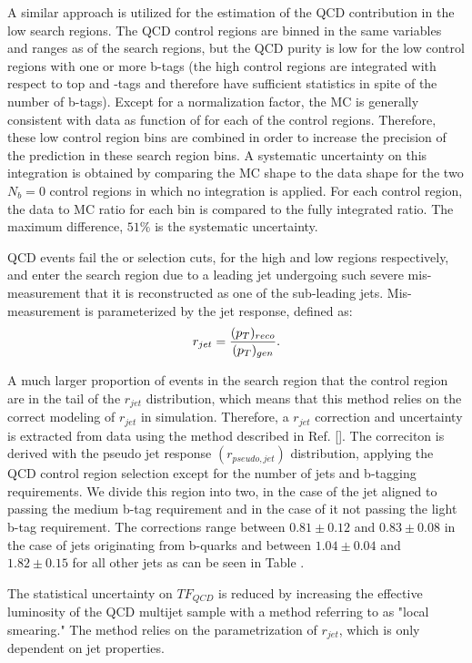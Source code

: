 A similar approach is utilized for the estimation of the QCD contribution in the low \dm{} search regions. The QCD control regions are binned in the same variables and ranges as of the search regions, but the QCD purity is low for the low \dm{} control regions with one or more b-tags (the high \dm{} control regions are integrated with respect to top and \W-tags and therefore have sufficient statistics in spite of the number of b-tags). Except for a normalization factor, the MC is generally consistent with data as function of \met{} for each of the control regions. Therefore, these low \dm{} control region \met{} bins are combined in order to increase the precision of the prediction in these search region bins. A systematic uncertainty on this integration is obtained by comparing the MC \met{} shape to the data shape for the two $N_b=0$ control regions in which no integration is applied. For each control region, the data to MC ratio for each \met{} bin is compared to the fully integrated ratio. The maximum difference, $51\%$ is the systematic uncertainty.

QCD events fail the \qcdhighdm{} or \qcdlowdm{} selection cuts, for the high and low \dm{} regions respectively, and enter the search region due to a leading jet undergoing such severe mis-measurement that it is reconstructed as one of the sub-leading jets. Mis-measurement is parameterized by the jet response, defined as:
\begin{equation}
r_{jet}=\frac{(p_{T})_{reco}}{(p_{T})_{gen}}.
\end{equation}

A much larger proportion of events in the search region that the control region are in the tail of the $r_{jet}$ distribution, which means that this method relies on the correct modeling of $r_{jet}$ in simulation. Therefore, a $r_{jet}$ correction and uncertainty is extracted from data using the method described in Ref. []. The correciton is derived with the pseudo jet response $(r_{pseudo,jet})$ distribution, applying the QCD control region selection except for the number of jets and b-tagging requirements. We divide this region into two, in the case of the jet aligned to \met{} passing the medium b-tag requirement and in the case of it not passing the light b-tag requirement. The corrections range between $0.81\pm0.12$ and $0.83\pm0.08$ in the case of jets originating from b-quarks and between $1.04\pm0.04$ and $1.82\pm0.15$ for all other jets as can be seen in Table .

The statistical uncertainty on $TF_{QCD}$ is reduced by increasing the effective luminosity of the QCD multijet sample with a method referring to as "local smearing." The method relies on the parametrization of $r_{jet}$, which is only dependent on jet properties.


